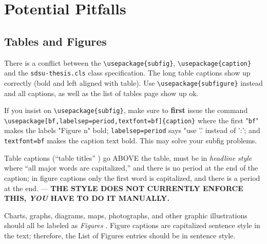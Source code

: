 


\section{Potential Pitfalls}

\subsection{Tables and Figures}

There is a conflict between the \verb+\usepackage{subfig}+,
\verb+\usepackage{caption}+ and the \verb+sdsu-thesis.cls+ class
specification.  The long table captions show up correctly (bold and
left aligned with table).  Use \verb+\usepackage{subfigure}+ instead
and all captions, as well as the list of tables page show up ok.

If you insist on \verb+\usepackage{subfig}+, make sure to
\textbf{first} issue the command
\verb+\usepackage[bf,labelsep=period,textfont=bf]{caption}+ where the
first "\verb+bf+" makes the labels "Figure n" bold;
\verb+labelsep=period+ says "use '.' instead of ':'; and
\verb+textfont=bf+ makes the caption text bold.  This may solve your
subfig problems.


Table captions (``table titles'' \cite{DTM2010spring}) go
ABOVE the table, must be
in \emph{headline style} where ``all major words are capitalized,''
and there is no period at the end of the caption; in figure captions
only the first word is capitalized, and there is a period at the
end. --- \textbf{THE STYLE DOES NOT CURRENTLY ENFORCE THIS, \emph{YOU}
  HAVE TO DO IT MANUALLY.}

Charts, graphs, diagrams, maps, photographs, and other graphic
illustrations should all be labeled as \emph{Figures} \cite[\S4.6.9,
and \S4.10.4]{DTM2010spring}.  Figure captions are capitalized
sentence style in the text; therefore, the List of Figures entries
should be in sentence style.


